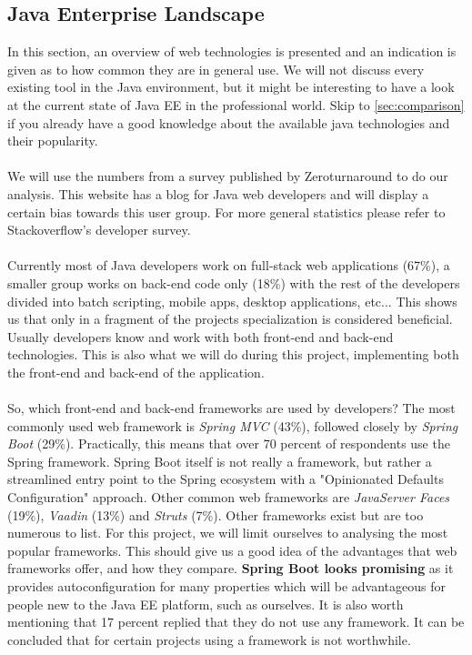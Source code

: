 \documentclass[12pt]{article}
\begin{document}
\begin{multicols}{2}
\subsection{Java Enterprise Landscape}\label{sec:javalandscape}
In this section, an overview of web technologies is presented and an indication is given as to how common they are in general use. We will not discuss every existing tool in the Java environment, but it might be interesting to have a look at the current state of Java EE in the professional world. Skip to \ref{sec:comparison} if you already have a good knowledge about the available java technologies and their popularity.
\\\\
We will use the numbers from a survey published by Zeroturnaround to do our analysis.\cite{JavaEELandscape73:online} This website has a blog for Java web developers and will display a certain bias towards this user group. For more general statistics please refer to Stackoverflow's developer survey. \cite{DeveloperSurvey95:online}
\\\\
Currently most of Java developers work on full-stack web applications (67\%), a smaller group works on back-end code only (18\%) with the rest of the developers divided into batch scripting, mobile apps, desktop applications, etc... This shows us that only in a fragment of the projects specialization is considered beneficial. Usually developers know and work with both front-end and back-end technologies. This is also what we will do during this project, implementing both the front-end and back-end of the application.
\\\\
So, which front-end and back-end frameworks are used by developers? The most commonly used web framework is \textit{Spring MVC} (43\%), followed closely by \textit{Spring Boot} (29\%). Practically, this means that over 70 percent of respondents use the Spring framework. Spring Boot itself is not really a framework, but rather a streamlined entry point to the Spring ecosystem with a "Opinionated Defaults Configuration" approach. \cite{SpringBootAdvantages67:online}\cite{SpringBootIntro23:online} Other common web frameworks are \textit{JavaServer Faces} (19\%), \textit{Vaadin} (13\%) and \textit{Struts} (7\%). Other frameworks exist but are too numerous to list. For this project, we will limit ourselves to analysing the most popular frameworks. This should give us a good idea of the advantages that web frameworks offer, and how they compare. \textbf{Spring Boot looks promising} as it provides autoconfiguration for many properties which will be advantageous for people new to the Java EE platform, such as ourselves. It is also worth mentioning that 17 percent replied that they do not use any framework. It can be concluded that for certain projects using a framework is not worthwhile. %

\end{multicols}
\end{document}
